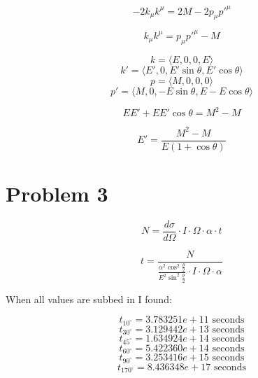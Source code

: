 \documentclass[12pt]{article}
\begin{document}
\begin{equation}
  -2k_{\mu}k^\mu= 2M - 2p_\mu p'^\mu
\end{equation}

\begin{equation}
  k_{\mu}k^\mu=  p_\mu p'^\mu -M
\end{equation}

\begin{equation}
   k=\langle E,0,0,E\rangle 
\end{equation}
\begin{equation}
   k'=\langle E',0,E'\sin\theta,E'\cos\theta\rangle 
\end{equation}
\begin{equation}
   p=\langle M,0,0,0\rangle 
\end{equation}
\begin{equation}
   p'=\langle M,0,-E\sin\theta,E-E\cos\theta\rangle 
\end{equation}

\begin{equation}
  EE'+EE'\cos\theta=M^2-M 
\end{equation}

\begin{equation}
  E'=\frac{M^2-M}{E(1+\cos\theta)}
\end{equation}

\section{Problem 3}

\begin{equation}
  N=\frac{d\sigma}{d\Omega} \cdot I \cdot \Omega \cdot\alpha\cdot t
\end{equation}

\begin{equation}
  t=\frac{N}{ \frac{\alpha^2\cos^2{\frac{\theta}{2}}}{E^2\sin^2{\frac{\theta}{2}} } \cdot I \cdot \Omega \cdot\alpha }
\end{equation}

When all values are subbed in I found:

\[
  t_{10^\circ} = 3.783251e+11 \mbox{ seconds}
\]
\[
  t_{30^\circ} = 3.129442e+13 \mbox{ seconds}
\]
\[
  t_{45^\circ} = 1.634924e+14 \mbox{ seconds}
\]
\[
  t_{60^\circ} = 5.422360e+14 \mbox{ seconds}
\]
\[
  t_{90^\circ} = 3.253416e+15 \mbox{ seconds}
\]
\[
  t_{170^\circ} = 8.436348e+17 \mbox{ seconds}
\]
\end{document}
